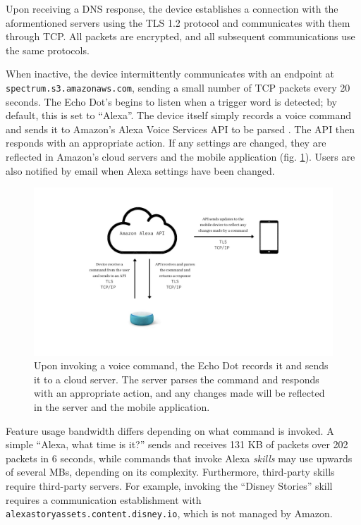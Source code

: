 \documentclass[12pt]{ucthesis}
\begin{document}
Upon receiving a DNS response, the device establishes a connection with the aformentioned servers using the TLS 1.2 protocol and communicates with them through TCP. All packets are encrypted, and all subsequent communications use the same protocols.

When inactive, the device intermittently communicates with an endpoint at \\\texttt{spectrum.s3.amazonaws.com}, sending a small number of TCP packets every 20 seconds. The Echo Dot's begins to listen when a trigger word is detected; by default, this is set to ``Alexa''. The device itself simply records a voice command and sends it to Amazon's Alexa Voice Services API to be parsed \cite{alexa}. The API then responds with an appropriate action. If any settings are changed, they are reflected in Amazon's cloud servers and the mobile application (fig. \ref{fig:voicecom}). Users are also notified by email when Alexa settings have been changed.

\begin{figure}
    \includegraphics[width=\textwidth]{voice command.jpg}
    \caption{Upon invoking a voice command, the Echo Dot records it and sends it to a cloud server. The server parses the command and responds with an appropriate action, and any changes made will be reflected in the server and the mobile application.}
    \label{fig:voicecom}
\end{figure}

Feature usage bandwidth differs depending on what command is invoked. A simple ``Alexa, what time is it?'' sends and receives 131 KB of packets over 202 packets in 6 seconds, while commands that invoke Alexa \textit{skills} may use upwards of several MBs, depending on its complexity. Furthermore, third-party skills require third-party servers. For example, invoking the ``Disney Stories'' skill requires a communication establishment with \texttt{alexastoryassets.content.disney.io}, which is not managed by Amazon.
\end{document}
